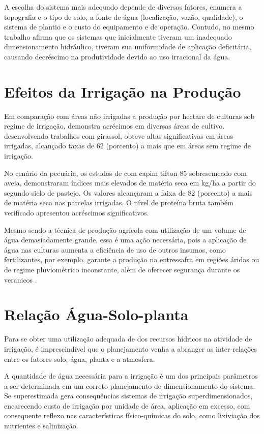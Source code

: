 A escolha do sistema mais adequado depende de diversos fatores, \cite{de2006avaliaccao} enumera a topografia e o tipo de solo, a fonte de água (localização, vazão, qualidade), o sistema de plantio e o custo do equipamento e de operação. Contudo, no mesmo trabalho afirma que os sistemas que inicialmente tiveram um inadequado dimensionamento hidráulico, tiveram sua uniformidade de aplicação deficitária, causando decréscimo na produtividade devido ao uso irracional da água.


\section{Efeitos da Irrigação na Produção}

Em comparação com áreas não irrigadas a produção por hectare de culturas sob regime de irrigação, demonstra acrécimos em diversas áreas de cultivo. \cite{sanches2013girassol} desenvolvendo trabalhos com girassol, obteve altas significativas em áreas irrigadas, alcançado taxas de 62 (porcento) a mais que em áreas sem regime de irrigação. 

No cenário da pecuária, os estudos de \cite{sanches2013tifton} com capim tifton 85   sobresemeado com aveia, demonstraram índices mais elevados de matéria seca em kg/ha a partir do segundo siclo de pastejo. Os valores alcançaram a faixa de 82 (porcento) a mais de matéria seca nas parcelas irrigadas. O nível de proteína bruta também verificado apresentou acréscimos significativos.

Mesmo sendo a técnica de produção agrícola com utilização de um volume de água demasiadamente grande, essa é uma ação necessária, pois a aplicação de água nas culturas aumenta a eficiência de uso de outros insumos, como fertilizantes, por exemplo, garante a produção na entressafra em regiões áridas ou de regime pluviométrico inconstante, além de oferecer segurança durante os veranicos \cite{de2008desenvolvimento}.

\section{Relação Água-Solo-planta}

Para se obter uma utilização adequada de dos recursos hídricos na atividade de irrigação, é imprescindível que o planejamento venha a abranger as inter-relações entre os fatores solo, água, planta e a atmosfera.

A quantidade de água necessária para a irrigação é um dos principais parâmetros a ser determinada em um correto planejamento de dimensionamento do sistema. Se superestimada gera consequências sistemas de irrigação superdimensionados, encarecendo custo de irrigação por unidade de área, aplicação em excesso, com consequente reflexo nas características físico-químicas do solo, como lixiviação dos nutrientes e salinização.

